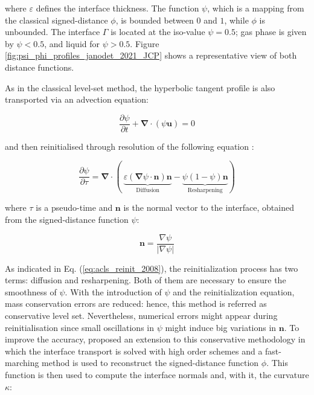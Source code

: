 where $\varepsilon$ defines the interface thickness. The function $\psi$, which is a mapping from the classical signed-distance $\phi$, is bounded between $0$ and $1$, while $\phi$ is unbounded. The interface $\Gamma$ is located at the iso-value $\psi = 0.5$; gas phase is given by $\psi < 0.5$, and liquid for $\psi > 0.5$. Figure \ref{fig:psi_phi_profiles_janodet_2021_JCP} shows a representative view of both distance functions.

As in the classical level-set method, the hyperbolic tangent profile is also transported via an advection equation:

\begin{equation}
    \frac{\partial \psi}{\partial t} + \boldsymbol{\nabla} \cdot \left( \psi \textbf{u} \right) = 0
\end{equation}

and then reinitialised through resolution of the following equation :


\begin{equation}
\label{eq:acls_reinit_2008}
\frac{\partial\psi}{\partial \tau}=\boldsymbol{\nabla}\cdot(\ \underbrace{\varepsilon(\boldsymbol{\nabla}\psi\cdot\textbf{n})\textbf{n}}_{\mathrm{Diffusion}}-\underbrace{\psi(1-\psi)\textbf{n}}_{\mathrm{Resharpening}})
\end{equation}

where $\tau$ is a pseudo-time and $\textbf{n}$ is the normal vector to the interface, obtained from the signed-distance function $\psi$:

\begin{equation}
\textbf{n} = \frac{\nabla \psi}{| \nabla \psi |} 
\end{equation}


As indicated in Eq. (\ref{eq:acls_reinit_2008}), the reinitialization process has two terms: diffusion and resharpening. Both of them are necessary to ensure the smoothness of $\psi$. With the introduction of $\psi$ and the reinitialization equation, mass conservation errors are reduced: hence, this method is referred as conservative level set. Nevertheless, numerical errors might appear during reinitialisation since small oscillations in $\psi$ might induce big variations in $\textbf{n}$. To improve the accuracy,  proposed an extension to this conservative methodology in which the interface transport is solved with high order schemes and a fast-marching method is used to reconstruct the signed-distance function $\phi$. This function is then used to compute the interface normals and, with it, the curvature $\kappa$: 

